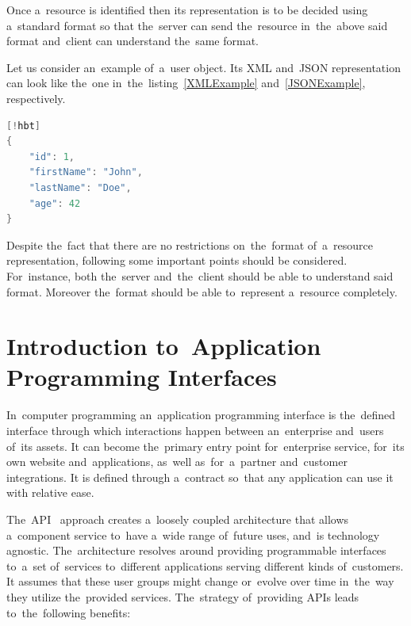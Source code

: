 Once a~resource is identified then its representation is to be decided using
a~standard format so that the~server can send the~resource in~the~above
said format and~client can understand the~same format. 

Let us consider an~example of~a~user object. Its XML and~JSON representation can
look like the~one in~the~listing~\ref{XMLExample} and~\ref{JSONExample},
respectively.\\

\begin{lstlisting}[caption=A JSON representation of~a~\textit{user} resource.,
label=JSONExample,language=Java][!hbt]
{
	"id": 1,
	"firstName": "John",
	"lastName": "Doe",
	"age": 42
}
\end{lstlisting}

Despite the~fact that there are no restrictions on~the~format of~a~resource
representation, following some important points should be considered.
For~instance, both the~server and~the~client should be able to understand said
format. Moreover the~format should be able to~represent a~resource completely.

\section{Introduction to~Application Programming Interfaces}
In~computer programming an~application programming interface is the~defined
interface through which interactions happen between an~enterprise and~users
of~its assets. It can become the~primary entry point for~enterprise service,
for~its own website and~applications, as~well as~for~a~partner and~customer
integrations. It is defined through a~contract so~that any application can use
it with relative ease. 

The~API~\cite{RESTfulAPI} approach creates a~loosely coupled architecture that
allows a~component service to~have a~wide range of~future uses, and~is technology agnostic.
The~architecture resolves around providing programmable interfaces to~a~set
of~services to~different applications serving different kinds of~customers. It
assumes that these user groups might change or~evolve over time in~the~way they
utilize the~provided services. The~strategy of~providing APIs leads
to~the~following benefits:


